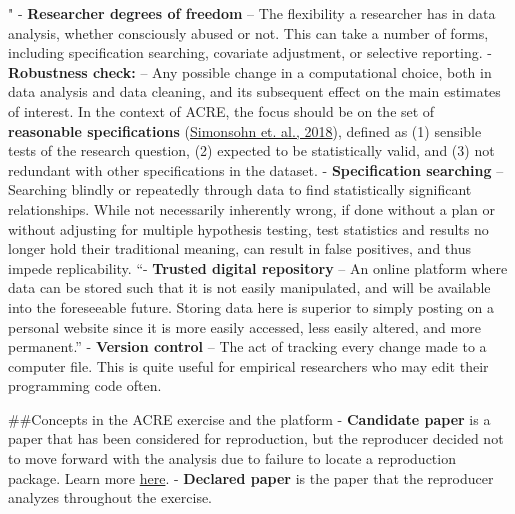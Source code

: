 \documentclass[]{book}
\begin{document}
" - \textbf{Researcher degrees of freedom} -- The flexibility a researcher has in data analysis, whether consciously abused or not. This can take a number of forms, including specification searching, covariate adjustment, or selective reporting.
- \textbf{Robustness check:} -- Any possible change in a computational choice, both in data analysis and data cleaning, and its subsequent effect on the main estimates of interest. In the context of ACRE, the focus should be on the set of \textbf{reasonable specifications} (\href{https://urisohn.com/sohn_files/wp/wordpress/wp-content/uploads/Paper-Specification-curve-2018-11-02.pdf}{Simonsohn et. al., 2018}), defined as (1) sensible tests of the research question, (2) expected to be statistically valid, and (3) not redundant with other specifications in the dataset.
- \textbf{Specification searching} -- Searching blindly or repeatedly through data to find statistically significant relationships. While not necessarily inherently wrong, if done without a plan or without adjusting for multiple hypothesis testing, test statistics and results no longer hold their traditional meaning, can result in false positives, and thus impede replicability.
``- \textbf{Trusted digital repository} -- An online platform where data can be stored such that it is not easily manipulated, and will be available into the foreseeable future. Storing data here is superior to simply posting on a personal website since it is more easily accessed, less easily altered, and more permanent.''
- \textbf{Version control} -- The act of tracking every change made to a computer file. This is quite useful for empirical researchers who may edit their programming code often.

\#\#Concepts in the ACRE exercise and the platform
- \textbf{Candidate paper} is a paper that has been considered for reproduction, but the reproducer decided not to move forward with the analysis due to failure to locate a reproduction package. Learn more \href{https://bitss.github.io/ACRE/scoping.html\#from-candidate-to-declared-paper}{here}.
- \textbf{Declared paper} is the paper that the reproducer analyzes throughout the exercise.


\end{document}
